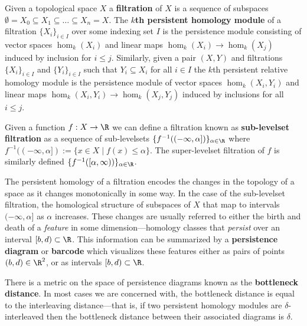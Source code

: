 
Given a topological space $X$ a \textbf{filtration} of $X$ is a sequence of subspaces $\emptyset = X_0\subseteq X_1\subseteq\ldots\subseteq X_n = X$.
The \textbf{$k$th persistent homology module} of a filtration $\{X_i\}_{i\in I}$ over some indexing set $I$ is the persistence module consisting of vector spaces $\hom_k(X_i)$ and linear maps $\hom_k(X_i)\to \hom_k(X_j)$ induced by inclusion for $i\leq j$.
Similarly, given a pair $(X,Y)$ and filtrations $\{X_i\}_{i\in I}$ and $\{Y_i\}_{i\in I}$ such that $Y_i\subseteq X_i$ for all $i\in I$ the $k$th persistent relative homology module is the persistence module of vector spaces $\hom_k(X_i, Y_i)$ and linear maps $\hom_k(X_i, Y_i)\to\hom_k(X_j, Y_j)$ induced by inclusions for all $i\leq j$.

Given a function $f: X\to \R$ we can define a filtration known as \textbf{sub-levelset filtration} as a sequence of sub-levelsets $\{f^{-1}((-\infty, \alpha])\}_{\alpha\in\R}$ where $f^{-1}((-\infty, \alpha]) := \{x\in X\mid f(x)\leq\alpha\}$.
The super-levelset filtration of $f$ is similarly defined $\{f^{-1}([\alpha,\infty))\}_{\alpha\in\R}$.

The persistent homology of a filtration encodes the changes in the topology of a space as it changes monotonically in some way.
In the case of the sub-levelset filtration, the homological structure of subspaces of $X$ that map to intervals $(-\infty,\alpha]$ as $\alpha$ increases.
These changes are usually referred to either the birth and death of a \emph{feature} in some dimension---homology classes that \emph{persist} over an interval $[b, d)\subset\R$.
This information can be summarized by a \textbf{persistence diagram} or \textbf{barcode} which visualizes these features either as pairs of points $(b, d)\in\R^2$, or as intervals $[b, d)\subset\R$.

There is a metric on the space of persistence diagrams known as the \textbf{bottleneck distance}.
In most cases we are concerned with, the bottleneck distance is equal to the interleaving distance---that is, if two persistent homology modules are $\delta$-interleaved then the bottleneck distance between their associated diagrams is $\delta$.
